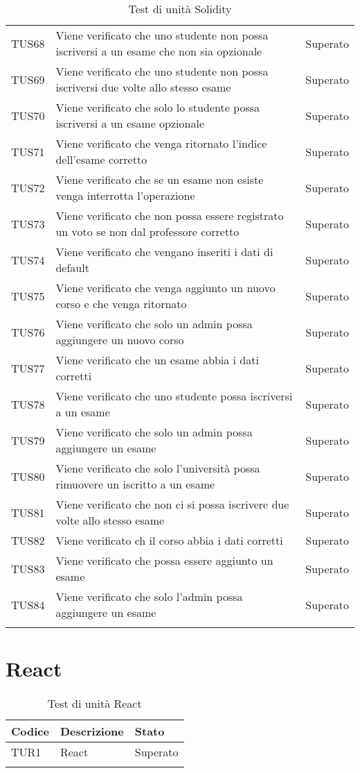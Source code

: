\documentclass[PianoDiQualifica.tex]{subfiles}
\begin{document}
\begin{longtable}[H]{P{2cm}P{8.5cm}P{3cm}}
	TUS68 & Viene verificato che uno studente non possa iscriversi a un esame che non sia opzionale & Superato \\
	TUS69 & Viene verificato che uno studente non possa iscriversi due volte allo stesso esame & Superato \\
	TUS70 & Viene verificato che solo lo studente possa iscriversi a un esame opzionale & Superato \\
	TUS71 & Viene verificato che venga ritornato l'indice dell'esame corretto & Superato \\
	TUS72 & Viene verificato che se un esame non esiste venga interrotta l'operazione & Superato \\
	TUS73 & Viene verificato che non possa essere registrato un voto se non dal professore corretto & Superato \\
	TUS74 & Viene verificato che vengano inseriti i dati di default & Superato \\
	TUS75 & Viene verificato che venga aggiunto un nuovo corso e che venga ritornato & Superato \\
	TUS76 & Viene verificato che solo un admin possa aggiungere un nuovo corso & Superato \\
	TUS77 & Viene verificato che un esame abbia i dati corretti & Superato \\
	TUS78 & Viene verificato che uno studente possa iscriversi a un esame & Superato \\
	TUS79 & Viene verificato che solo un admin possa aggiungere un esame & Superato \\
	TUS80 & Viene verificato che solo l'università possa rimuovere un iscritto a un esame & Superato \\
	TUS81 & Viene verificato che non ci si possa iscrivere due volte allo stesso esame & Superato \\
	TUS82 & Viene verificato ch il corso abbia i dati corretti & Superato \\
	TUS83 & Viene verificato che possa essere aggiunto un esame & Superato \\
	TUS84 & Viene verificato che solo l'admin possa aggiungere un esame & Superato \\
	
	\hiderowcolors
	\caption{Test di unità Solidity}
\end{longtable}

\section{React}
\begin{longtable}[H]{P{2cm}P{8.5cm}P{3cm}}
	\color{CHeaderText}\textbf{Codice} & 
	\color{CHeaderText}\textbf{Descrizione} & 
	\color{CHeaderText}\textbf{Stato}\\
	\endhead
	TUR1 & React & Superato \\ 
	\hiderowcolors
	\caption{Test di unità React}
\end{longtable}
\end{document}
